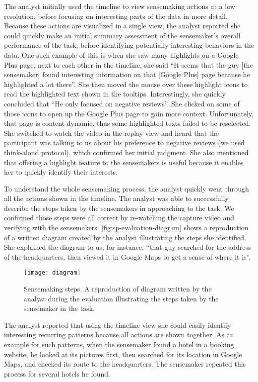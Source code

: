 The analyst initially used the timeline to view sensemaking actions at a low resolution, before focusing on interesting parts of the data in more detail. Because these actions are visualized in a single view, the analyst reported she could quickly make an initial summary assessment of the sensemaker's overall performance of the task, before identifying potentially interesting behaviors in the data. One such example of this is when she saw many highlights on a Google Plus page, next to each other in the timeline, she said ``It seems that the guy [the sensemaker] found interesting information on that [Google Plus] page because he highlighted a lot there''. She then moved the mouse over these highlight icons to read the highlighted text shown in the tooltips. Interestingly, she quickly concluded that ``He only focused on negative reviews''. She clicked on some of those icons to open up the Google Plus page to gain more context. Unfortunately, that page is content-dynamic, thus some highlighted texts failed to be reselected. She switched to watch the video in the replay view and heard that the participant was talking to us about his preference to negative reviews (we used think-aloud protocol), which confirmed her initial judgment. She also mentioned that offering a highlight feature to the sensemakers is useful because it enables her to quickly identify their interests.

To understand the whole sensemaking process, the analyst quickly went through all the actions shown in the timeline. The analyst was able to successfully describe the steps taken by the sensemakers in approaching to the task. We confirmed those steps were all correct by re-watching the capture video and verifying with the sensemakers. \autoref{fig:sp-evaluation-diagram} shows a reproduction of a written diagram created by the analyst illustrating the steps she identified. She explained the diagram to us; for instance, ``that guy searched for the address of the headquarters, then viewed it in Google Maps to get a sense of where it is''.

\begin{figure}
\centering
\texttt{[image: diagram]}
\caption[Sensemaking steps]{Sensemaking steps. A reproduction of diagram written by the analyst during the evaluation illustrating the steps taken by the sensemaker in the task.}
\label{fig:sp-evaluation-diagram}
\end{figure}

The analyst reported that using the timeline view she could easily identify interesting recurring patterns because all actions are shown together. As an example for such patterns, when the sensemaker found a hotel in a booking website, he looked at its pictures first, then searched for its location in Google Maps, and checked its route to the headquarters. The sensemaker repeated this process for several hotels he found.

